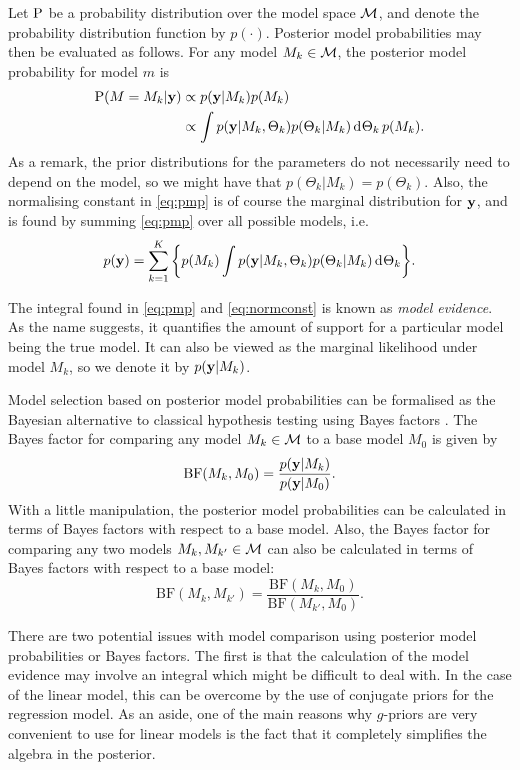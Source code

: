 \documentclass[a4paper,showframe,11pt]{report}
\begin{document}
Let $\operatorname{P}$ be a probability distribution over the model space ${\mathcal M}$, and denote the probability distribution function by $p(\cdot)$.
Posterior model probabilities may then be evaluated as follows. 
For any model $M_k \in {\mathcal M}$, the posterior model probability for model $m$ is
\begin{align}\label{eq:pmp}
  \operatorname{P}(M=M_k|{\mathbf y}) &\propto p({\mathbf y}|M_k)p(M_k) \nonumber \\
  &\propto \int p({\mathbf y}|M_k,\Theta_k)p(\Theta_k|M_k) \operatorname{d}\hspace{0.5pt}\!\Theta_k \, p(M_k).
\end{align}
As a remark, the prior distributions for the parameters do not necessarily need to depend on the model, so we might have that $p(\Theta_k|M_k)=p(\Theta_k)$.
Also, the normalising constant in \cref{eq:pmp} is of course the marginal distribution for ${\mathbf y}$, and is found by summing \cref{eq:pmp} over all possible models, i.e.
\begin{align}\label{eq:normconst}
  p({\mathbf y}) = \sum_{k=1}^K \bigg\{ p(M_k) \int p({\mathbf y}|M_k,\Theta_k)p(\Theta_k|M_k) \operatorname{d}\hspace{0.5pt}\!\Theta_k \bigg\}.
\end{align}

The integral found in \cref{eq:pmp} and \cref{eq:normconst} is known as \emph{model evidence}.
As the name suggests, it quantifies the amount of support for a particular model being the true model.
It can also be viewed as the marginal likelihood under model $M_k$, so we denote it by $p({\mathbf y}|M_k)$.

Model selection based on posterior model probabilities can be formalised as the Bayesian alternative to classical hypothesis testing using Bayes factors \citep{kass1995bayes}.
The Bayes factor for comparing any model $M_k \in {\mathcal M}$ to a base model $M_0$ is given by
\[
  \text{BF}(M_k,M_0) = \frac{p({\mathbf y}|M_k)}{p({\mathbf y}|M_0)}.
\]
With a little manipulation, the posterior model probabilities can be calculated in terms of Bayes factors with respect to a base model.
Also, the Bayes factor for comparing any two models $M_k,M_{k'} \in {\mathcal M}$ can also be calculated in terms of Bayes factors with respect to a base model:
\[
    \text{BF}(M_k,M_{k'}) = \frac{\text{BF}(M_k,M_0)}{\text{BF}(M_{k'},M_0)}.
\]

There are two potential issues with model comparison using posterior model probabilities or Bayes factors.
The first is that the calculation of the model evidence may involve an integral which might be difficult to deal with.
In the case of the linear model, this can be overcome by the use of conjugate priors for the regression model.
As an aside, one of the main reasons why $g$-priors \citep{zellner1986assessing} are very convenient to use for linear models is the fact that it completely simplifies the algebra in the posterior.
\end{document}
